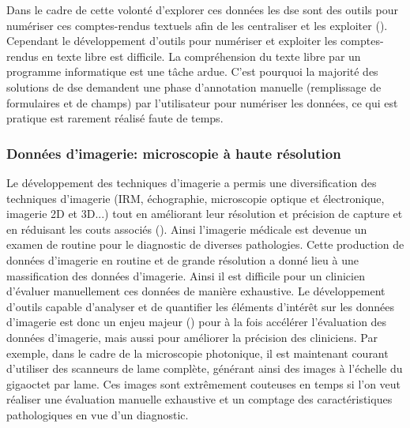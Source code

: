 Dans le cadre de cette volonté d'explorer ces données les \gls{dse} sont des outils pour numériser ces comptes-rendus textuels afin de les centraliser et les exploiter (\cite{graber_impact_2017}). Cependant le développement d'outils pour numériser et exploiter les comptes-rendus en texte libre est difficile. La compréhension du texte libre par un programme informatique est une tâche ardue. C'est pourquoi la majorité des solutions de \gls{dse} demandent une phase d'annotation manuelle (remplissage de formulaires et de champs) par l'utilisateur pour numériser les données, ce qui est pratique est rarement réalisé faute de temps.

\subsubsection{Données d'imagerie: microscopie à haute résolution}
Le développement des techniques d'imagerie a permis une diversification des techniques d'imagerie (IRM, échographie, microscopie optique et électronique, imagerie 2D et 3D...) tout en améliorant leur résolution et précision de capture  et en réduisant les couts associés (\cite{abdallah_history_2017, prakash_super-resolution_2022, sheppard_structured_2021}). Ainsi l'imagerie médicale est devenue un examen de routine pour le diagnostic de diverses pathologies. Cette production de données d'imagerie en routine et de grande résolution a donné lieu à une massification des données d'imagerie. Ainsi il est difficile pour un clinicien d'évaluer manuellement ces données de manière exhaustive. Le développement d'outils capable d'analyser et de quantifier les éléments d'intérêt sur les données d'imagerie est donc un enjeu majeur (\cite{tchito_tchapga_biomedical_2021}) pour à la fois accélérer l'évaluation des données d'imagerie, mais aussi pour améliorer la précision des cliniciens. Par exemple, dans le cadre de la microscopie photonique, il est maintenant courant d'utiliser des scanneurs de lame complète, générant ainsi des images à l'échelle du gigaoctet par lame. Ces images sont extrêmement couteuses en temps si l’on veut réaliser une évaluation manuelle exhaustive et un comptage des caractéristiques pathologiques en vue d'un diagnostic.


